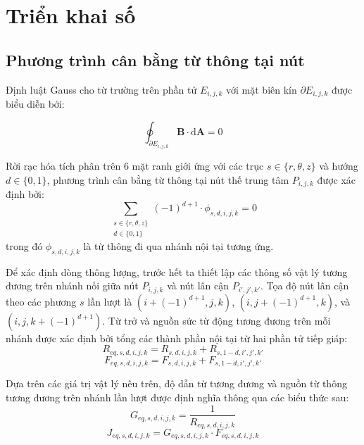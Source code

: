 \section{Triển khai số}
\subsection{Phương trình cân bằng từ thông tại nút}
Định luật Gauss cho từ trường trên phần tử $E_{i,j,k}$ với mặt biên kín $\partial E_{i,j,k}$ được biểu diễn bởi:

\begin{equation}
    \oint_{\partial E_{i,j,k}} \mathbf{B} \cdot \mathrm{d}\mathbf{A} = 0
\end{equation}

Rời rạc hóa tích phân trên 6 mặt ranh giới ứng với các trục $s \in \{r, \theta, z\}$ và hướng $d \in \{0, 1\}$, phương trình cân bằng từ thông tại nút thế trung tâm $P_{i,j,k}$ được xác định bởi:
\begin{equation}
    \sum_{\substack{s \in \{r, \theta, z\} \\ d \in \{0, 1\}}} (-1)^{d+1} \cdot \phi_{s,d,i,j,k} = 0
    \label{eq_gauss}
\end{equation}
trong đó $\phi_{s,d,i,j,k}$ là từ thông đi qua nhánh nội tại tương ứng.

Để xác định dòng thông lượng, trước hết ta thiết lập các thông số vật lý tương đương trên nhánh nối giữa nút $P_{i,j,k}$ và nút lân cận $P_{i',j',k'}$. Tọa độ nút lân cận theo các phương $s$ lần lượt là $(i + (-1)^{d+1}, j, k)$, $(i, j + (-1)^{d+1}, k)$, và $(i, j, k + (-1)^{d+1})$. Từ trở và nguồn sức từ động tương đương trên mỗi nhánh được xác định bởi tổng các thành phần nội tại từ hai phần tử tiếp giáp:
\begin{equation}
    R_{eq,s,d,i,j,k} = R_{s,d,i,j,k} + R_{s,1-d,i',j',k'}
\end{equation}
\begin{equation}
    F_{eq,s,d,i,j,k} = F_{s,d,i,j,k} + F_{s,1-d,i',j',k'}
\end{equation}

Dựa trên các giá trị vật lý nêu trên, độ dẫn từ tương đương và nguồn từ thông tương đương trên nhánh lần lượt được định nghĩa thông qua các biểu thức sau:
\begin{equation}
    G_{eq,s,d,i,j,k} = \frac{1}{R_{eq,s,d,i,j,k}}
\end{equation}
\begin{equation}
    J_{eq,s,d,i,j,k} = G_{eq,s,d,i,j,k} \cdot F_{eq,s,d,i,j,k}
\end{equation}

